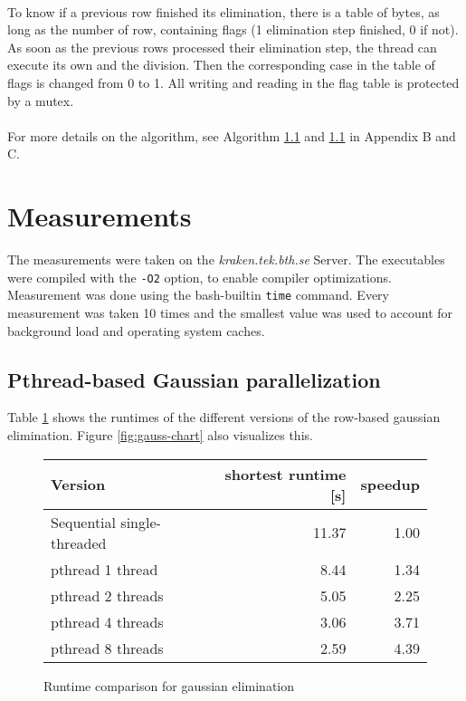 \documentclass[]{article}
\begin{document}
\paragraph{} To know if a previous row finished its elimination, there is a table of bytes, as long as the number of row, containing flags (1 elimination step finished, 0 if not). As soon as the previous rows processed their elimination step, the thread can execute its own and the division. Then the corresponding case in the table of flags is changed from 0 to 1. All writing and reading in the flag table is protected by a mutex. 

\paragraph{} For more details on the algorithm, see Algorithm \ref{} and \ref{} in Appendix B and C.

\section{Measurements}

The measurements were taken on the \emph{kraken.tek.bth.se} Server. The executables were compiled with the \texttt{-O2} option, to enable compiler optimizations. Measurement was done using the bash-builtin \texttt{time} command. Every measurement was taken 10 times and the smallest value was used to account for background load and operating system caches.

\subsection{Pthread-based Gaussian parallelization}

Table \ref{tab:gauss-runtime} shows the runtimes of the different versions of the row-based gaussian elimination. Figure \ref{fig:gauss-chart} also visualizes this.

\begin{figure}[h]
	\centering
	\begin{tabular}{|l|r|r|}
		\hline
		\textbf{Version} & \textbf{shortest runtime [s]} & \textbf{speedup} \\
		\hline
		Sequential single-threaded		& 11.37 & 1.00 \\ 
		\hline 
		pthread 1 thread				& 8.44 & 1.34 \\ 
		\hline 
		pthread 2 threads				& 5.05 & 2.25 \\ 
		\hline 
		pthread 4 threads 				& 3.06 & 3.71 \\ 
		\hline 
		pthread 8 threads				& 2.59 & 4.39 \\ 
		\hline 
	\end{tabular} 
	\caption{Runtime comparison for gaussian elimination}
	\label{tab:gauss-runtime}
\end{figure}
\end{document}
